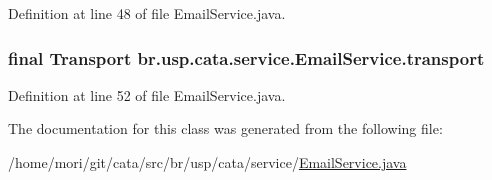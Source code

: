Definition at line 48 of file Email\+Service.\+java.

\hypertarget{classbr_1_1usp_1_1cata_1_1service_1_1_email_service_a57a5b449146d14f21719964cea77a272}{
\subsubsection[{transport}]{\setlength{\rightskip}{0pt plus 5cm}final Transport br.\+usp.\+cata.\+service.\+Email\+Service.\+transport\hspace{0.3cm}{\ttfamily [private]}}}\label{classbr_1_1usp_1_1cata_1_1service_1_1_email_service_a57a5b449146d14f21719964cea77a272}


Definition at line 52 of file Email\+Service.\+java.



The documentation for this class was generated from the following file\+:\begin{DoxyCompactItemize}
\item 
/home/mori/git/cata/src/br/usp/cata/service/\hyperlink{_email_service_8java}{Email\+Service.\+java}\end{DoxyCompactItemize}
